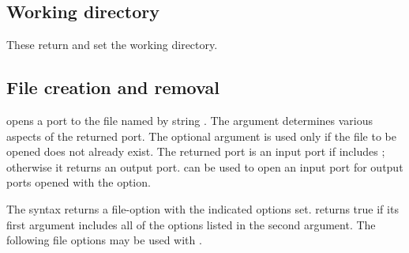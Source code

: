\subsection{Working directory}

\begin{protos}
\end{protos}
\noindent
These return and set the working directory.

\subsection{File creation and removal}

\begin{protos}
\end{protos}
\noindent
{} opens a port to the file named by string .
The  argument determines various aspects of the 
 returned port.
The optional  argument is used only if the file to be opened
 does not already exist.
The returned port is an input port if  includes
 ; otherwise it returns an output port.
 can be used to open an input port for
 output ports opened with the  option.

\begin{protos}
\end{protos}
\noindent
The syntax  returns a file-option with the
 indicated options set.
 returns true if its first argument includes all of
 the options listed in the second argument.
The following file options may be used with .

